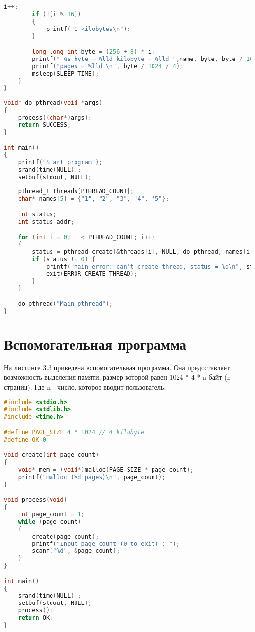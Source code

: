 \begin{lstlisting}[language=c, label=some-code, caption=Анализируемая программа]
		i++;
		if (!(i % 16))
		{
			printf("1 kilobytes\n");
		}

		long long int byte = (256 + 8) * i;
		printf(" %s byte = %lld kilobyte = %lld ",name, byte, byte / 1024);
		printf("pages = %lld \n", byte / 1024 / 4);
		msleep(SLEEP_TIME);
	}
}
	
void* do_pthread(void *args) 
{
	process((char*)args);
	return SUCCESS;
}

int main() 
{
	printf("Start program");
	srand(time(NULL));
	setbuf(stdout, NULL);
	
	pthread_t threads[PTHREAD_COUNT];
	char* names[5] = {"1", "2", "3", "4", "5"};

	int status;
	int status_addr;

	for (int i = 0; i < PTHREAD_COUNT; i++)
	{
		status = pthread_create(&threads[i], NULL, do_pthread, names[i]);
		if (status != 0) {
			printf("main error: can't create thread, status = %d\n", status);
			exit(ERROR_CREATE_THREAD);
		}
	}

	do_pthread("Main pthread"); 
}
\end{lstlisting}

\section{Вспомогательная программа}

На листинге 3.3 приведена вспомогательная программа.
Она предоставляет возможность выделения памяти, размер которой равен 1024 * 4 * n байт (n страниц). 
Где n - число, которое вводит пользователь.

\begin{lstlisting}[language=c, label=some-code, caption=Вспомогательная программа]
#include <stdio.h>
#include <stdlib.h>
#include <time.h>

#define PAGE_SIZE 4 * 1024 // 4 kilobyte
#define OK 0

void create(int page_count)
{
	void* mem = (void*)malloc(PAGE_SIZE * page_count);
	printf("malloc (%d pages)\n", page_count);
}

void process(void)
{
	int page_count = 1;
	while (page_count)
	{
		create(page_count);
		printf("Input page count (0 to exit) : ");
		scanf("%d", &page_count);
	}
}

int main()
{
	srand(time(NULL));
	setbuf(stdout, NULL);
	process();
	return OK;
}
\end{lstlisting}



